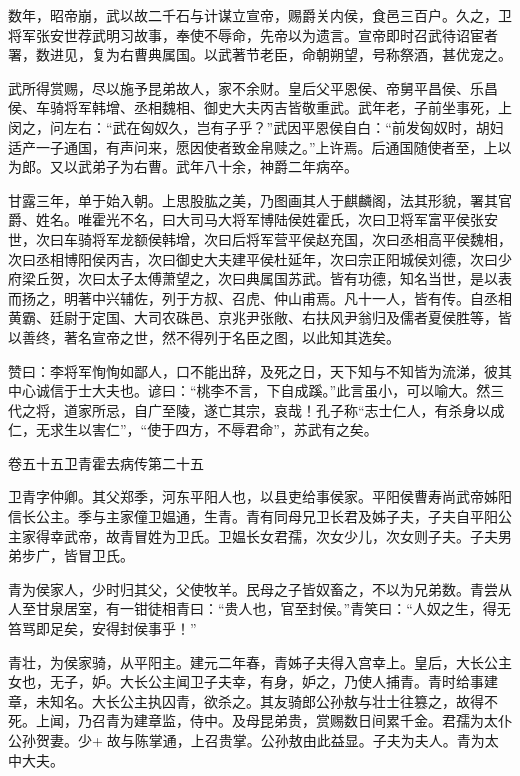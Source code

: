 \documentclass[12pt,UTF8]{ctexbook}
\begin{document}
数年，昭帝崩，武以故二千石与计谋立宣帝，赐爵关内侯，食邑三百户。久之，卫将军张安世荐武明习故事，奉使不辱命，先帝以为遗言。宣帝即时召武待诏宦者署，数进见，复为右曹典属国。以武著节老臣，命朝朔望，号称祭酒，甚优宠之。



武所得赏赐，尽以施予昆弟故人，家不余财。皇后父平恩侯、帝舅平昌侯、乐昌侯、车骑将军韩增、丞相魏相、御史大夫丙吉皆敬重武。武年老，子前坐事死，上闵之，问左右：“武在匈奴久，岂有子乎？”武因平恩侯自白：“前发匈奴时，胡妇适产一子通国，有声问来，愿因使者致金帛赎之。”上许焉。后通国随使者至，上以为郎。又以武弟子为右曹。武年八十余，神爵二年病卒。



甘露三年，单于始入朝。上思股肱之美，乃图画其人于麒麟阁，法其形貌，署其官爵、姓名。唯霍光不名，曰大司马大将军博陆侯姓霍氏，次曰卫将军富平侯张安世，次曰车骑将军龙额侯韩增，次曰后将军营平侯赵充国，次曰丞相高平侯魏相，次曰丞相博阳侯丙吉，次曰御史大夫建平侯杜延年，次曰宗正阳城侯刘德，次曰少府梁丘贺，次曰太子太傅萧望之，次曰典属国苏武。皆有功德，知名当世，是以表而扬之，明著中兴辅佐，列于方叔、召虎、仲山甫焉。凡十一人，皆有传。自丞相黄霸、廷尉于定国、大司农硃邑、京兆尹张敞、右扶风尹翁归及儒者夏侯胜等，皆以善终，著名宣帝之世，然不得列于名臣之图，以此知其选矣。



赞曰：李将军恂恂如鄙人，口不能出辞，及死之日，天下知与不知皆为流涕，彼其中心诚信于士大夫也。谚曰：“桃李不言，下自成蹊。”此言虽小，可以喻大。然三代之将，道家所忌，自广至陵，遂亡其宗，哀哉！孔子称“志士仁人，有杀身以成仁，无求生以害仁”，“使于四方，不辱君命”，苏武有之矣。





卷五十五卫青霍去病传第二十五



卫青字仲卿。其父郑季，河东平阳人也，以县吏给事侯家。平阳侯曹寿尚武帝姊阳信长公主。季与主家僮卫媪通，生青。青有同母兄卫长君及姊子夫，子夫自平阳公主家得幸武帝，故青冒姓为卫氏。卫媪长女君孺，次女少儿，次女则子夫。子夫男弟步广，皆冒卫氏。



青为侯家人，少时归其父，父使牧羊。民母之子皆奴畜之，不以为兄弟数。青尝从人至甘泉居室，有一钳徒相青曰：“贵人也，官至封侯。”青笑曰：“人奴之生，得无笞骂即足矣，安得封侯事乎！”



青壮，为侯家骑，从平阳主。建元二年春，青姊子夫得入宫幸上。皇后，大长公主女也，无子，妒。大长公主闻卫子夫幸，有身，妒之，乃使人捕青。青时给事建章，未知名。大长公主执囚青，欲杀之。其友骑郎公孙敖与壮士往篡之，故得不死。上闻，乃召青为建章监，侍中。及母昆弟贵，赏赐数日间累千金。君孺为太仆公孙贺妻。少+故与陈掌通，上召贵掌。公孙敖由此益显。子夫为夫人。青为太中大夫。
\end{document}
